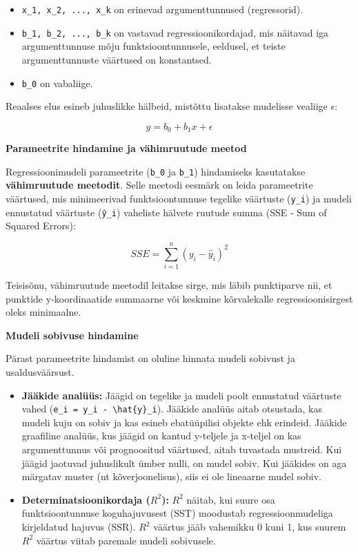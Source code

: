 \documentclass[
]{book}
\providecommand{\tightlist}{%
  \setlength{\itemsep}{0pt}\setlength{\parskip}{0pt}}
\theoremstyle{definition}
\theoremstyle{definition}
\theoremstyle{definition}
\theoremstyle{definition}
\theoremstyle{remark}
\begin{document}
\begin{itemize}
\tightlist
\item
  \texttt{x\_1,\ x\_2,\ ...,\ x\_k} on erinevad argumenttunnused (regressorid).
\item
  \texttt{b\_1,\ b\_2,\ ...,\ b\_k} on vastavad regressioonikordajad, mis näitavad iga argumenttunnuse mõju funktsioontunnusele, eeldusel, et teiste argumenttunnuste väärtused on konstantsed.
\item
  \texttt{b\_0} on vabaliige.
\end{itemize}

Reaalses elus esineb juhuslikke hälbeid, mistõttu lisatakse mudelisse vealiige \(\epsilon\):

\[y = b_0 + b_1x + \epsilon\]

\textbf{Parameetrite hindamine ja vähimruutude meetod}

Regressioonimudeli parameetrite (\texttt{b\_0} ja \texttt{b\_1}) hindamiseks kasutatakse \textbf{vähimruutude meetodit}. Selle meetodi eesmärk on leida parameetrite väärtused, mis minimeerivad funktsioontunnuse tegelike väärtuste (\texttt{y\_i}) ja mudeli ennustatud väärtuste (\texttt{ŷ\_i}) vaheliste hälvete ruutude summa (SSE - Sum of Squared Errors):

\[SSE = \sum_{i=1}^{n}(y_i - \hat{y}_i)^2\]

Teisisõnu, vähimruutude meetodil leitakse sirge, mis läbib punktiparve nii, et punktide y-koordinaatide summaarne või keskmine kõrvalekalle regressioonisirgest oleks minimaalne.

\textbf{Mudeli sobivuse hindamine}

Pärast parameetrite hindamist on oluline hinnata mudeli sobivust ja usaldusväärsust.

\begin{itemize}
\tightlist
\item
  \textbf{Jääkide analüüs:} Jäägid on tegelike ja mudeli poolt ennustatud väärtuste vahed (\texttt{e\_i\ =\ y\_i\ -\ \textbackslash{}hat\{y\}\_i}). Jääkide analüüs aitab otsustada, kas mudeli kuju on sobiv ja kas esineb ebatüüpilisi objekte ehk erindeid. Jääkide graafiline analüüs, kus jäägid on kantud y-teljele ja x-teljel on kas argumenttunnus või prognoositud väärtused, aitab tuvastada mustreid. Kui jäägid jaotuvad juhuslikult ümber nulli, on mudel sobiv. Kui jääkides on aga märgatav muster (nt kõverjoonelisus), siis ei ole lineaarne mudel sobiv.
\item
  \textbf{Determinatsioonikordaja (\(R^2\)):} \(R^2\) näitab, kui suure osa funktsioontunnuse koguhajuvusest (SST) moodustab regressioonmudeliga kirjeldatud hajuvus (SSR). \(R^2\) väärtus jääb vahemikku 0 kuni 1, kus suurem \(R^2\) väärtus viitab paremale mudeli sobivusele.
\end{itemize}
\end{document}

